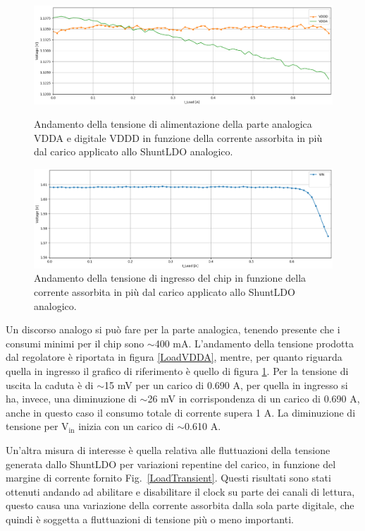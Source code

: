 \begin{figure}
\centering
\includegraphics[width=\textwidth]{Immagini/LoadVDDA}
\caption{Andamento della tensione di alimentazione della parte analogica VDDA e digitale VDDD in funzione della corrente assorbita in più dal carico applicato allo ShuntLDO analogico.}
\label{LoadVDDA}
\includegraphics[width=\textwidth]{Immagini/LoadVINA}
\caption{Andamento della tensione di ingresso del chip in funzione della corrente assorbita in più dal carico applicato allo ShuntLDO analogico.}
\label{LoadVINA}
\end{figure}
Un discorso analogo si può fare per la parte analogica, tenendo presente che i consumi minimi per il chip sono $\sim$400 mA.
L'andamento della tensione prodotta dal regolatore è riportata in figura \ref{LoadVDDA}, mentre, per quanto riguarda quella in ingresso il grafico di riferimento è quello di figura \ref{LoadVINA}. 
Per la tensione di uscita la caduta è di $\sim$15 mV per un carico di 0.690 A, %
per quella in ingresso si ha, invece, una diminuzione di $\sim$26 mV in corrispondenza di un carico di 0.690 A, anche in questo caso il consumo totale di corrente supera 1 A. 
La diminuzione di tensione per $\mathrm{V_{in}}$ inizia con un carico di $\sim$0.610 A.


Un'altra misura di interesse è quella relativa alle fluttuazioni della tensione generata dallo ShuntLDO per variazioni repentine del carico, in funzione del margine di corrente fornito Fig.~\ref{LoadTransient}. 
Questi risultati sono stati ottenuti andando ad abilitare e disabilitare il clock su parte dei canali di lettura, questo causa una variazione della corrente assorbita dalla sola parte digitale, che quindi è soggetta a fluttuazioni di tensione più o meno importanti.

